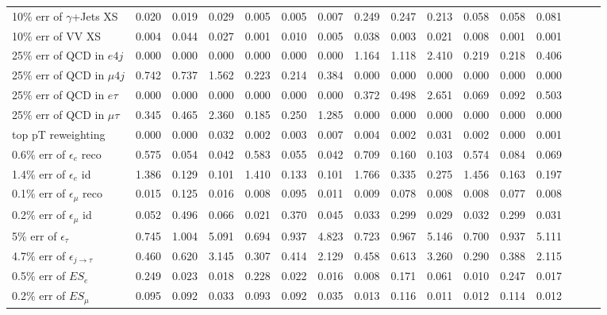 \begin{sidewaystable}[p]
\begin{tabular}{|l|ccc|ccc|ccc|ccc|ccc|}
  10$\%$ err of $\gamma$+Jets XS             & 0.020 & 0.019 & 0.029 & 0.005 & 0.005 & 0.007 & 0.249 & 0.247 & 0.213 & 0.058 & 0.058 & 0.081 \\ 
  10$\%$ err of VV XS                        & 0.004 & 0.044 & 0.027 & 0.001 & 0.010 & 0.005 & 0.038 & 0.003 & 0.021 & 0.008 & 0.001 & 0.001 \\ 
  25$\%$ err of QCD in $e 4j$                & 0.000 & 0.000 & 0.000 & 0.000 & 0.000 & 0.000 & 1.164 & 1.118 & 2.410 & 0.219 & 0.218 & 0.406 \\ 
  25$\%$ err of QCD in $\mu 4j$              & 0.742 & 0.737 & 1.562 & 0.223 & 0.214 & 0.384 & 0.000 & 0.000 & 0.000 & 0.000 & 0.000 & 0.000 \\ 
  25$\%$ err of QCD in $e\tau$               & 0.000 & 0.000 & 0.000 & 0.000 & 0.000 & 0.000 & 0.372 & 0.498 & 2.651 & 0.069 & 0.092 & 0.503 \\ 
  25$\%$ err of QCD in $\mu\tau$             & 0.345 & 0.465 & 2.360 & 0.185 & 0.250 & 1.285 & 0.000 & 0.000 & 0.000 & 0.000 & 0.000 & 0.000 \\ 
  top pT reweighting                         & 0.000 & 0.000 & 0.032 & 0.002 & 0.003 & 0.007 & 0.004 & 0.002 & 0.031 & 0.002 & 0.000 & 0.001 \\ 
  0.6$\%$ err of $\epsilon_e$ reco           & 0.575 & 0.054 & 0.042 & 0.583 & 0.055 & 0.042 & 0.709 & 0.160 & 0.103 & 0.574 & 0.084 & 0.069 \\ 
  1.4$\%$ err of $\epsilon_e$ id             & 1.386 & 0.129 & 0.101 & 1.410 & 0.133 & 0.101 & 1.766 & 0.335 & 0.275 & 1.456 & 0.163 & 0.197 \\ 
  0.1$\%$ err of $\epsilon_\mu$ reco         & 0.015 & 0.125 & 0.016 & 0.008 & 0.095 & 0.011 & 0.009 & 0.078 & 0.008 & 0.008 & 0.077 & 0.008 \\ 
  0.2$\%$ err of $\epsilon_\mu$ id           & 0.052 & 0.496 & 0.066 & 0.021 & 0.370 & 0.045 & 0.033 & 0.299 & 0.029 & 0.032 & 0.299 & 0.031 \\ 
  5$\%$ err of $\epsilon_\tau$               & 0.745 & 1.004 & 5.091 & 0.694 & 0.937 & 4.823 & 0.723 & 0.967 & 5.146 & 0.700 & 0.937 & 5.111 \\ 
  4.7$\%$ err of $\epsilon_{j\to\tau}$       & 0.460 & 0.620 & 3.145 & 0.307 & 0.414 & 2.129 & 0.458 & 0.613 & 3.260 & 0.290 & 0.388 & 2.115 \\ 
  0.5$\%$ err of $ES_{e}$                    & 0.249 & 0.023 & 0.018 & 0.228 & 0.022 & 0.016 & 0.008 & 0.171 & 0.061 & 0.010 & 0.247 & 0.017 \\ 
  0.2$\%$ err of $ES_{\mu}$                  & 0.095 & 0.092 & 0.033 & 0.093 & 0.092 & 0.035 & 0.013 & 0.116 & 0.011 & 0.012 & 0.114 & 0.012 \\ 

\end{tabular}
\end{sidewaystable}
